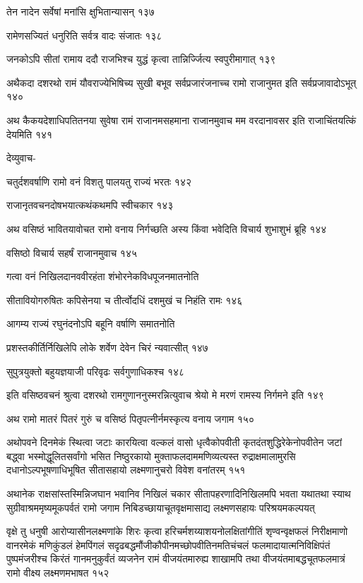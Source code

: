 तेन नादेन सर्वेषां मनांसि क्षुभितान्यासन् १३७

रामेणसज्यितं धनुरिति सर्वत्र वादः संजातः १३८

जनकोऽपि सीतां रामाय ददौ राजभिश्च युद्धं कृत्वा तान्निर्ज्जित्य स्वपुरीमागात् १३९

अथैकदा दशरथो रामं यौवराज्येभिषिच्य सुखी बभूव सर्वप्रजारंजनाच्च रामो राजानुमत इति
सर्वप्रजावादोऽभूत् १४०

अथ कैकयदेशाधिपतितनया सुवेषा रामं राजानमसहमाना राजानमुवाच मम वरदानावसर इति
राजाचिंतयत्किं देयमिति १४१

देव्युवाच-

चतुर्दशवर्षाणि रामो वनं विशतु पालयतु राज्यं भरतः १४२

राजानृतवचनदोषभयात्कथंकथमपि स्वीचकार १४३

अथ वसिष्ठं भावितयावोचत रामो वनाय निर्गच्छति अस्य किंवा भवेदिति विचार्य शुभाशुभं
ब्रूहि १४४

वसिष्ठो विचार्य सहर्षं राजानमुवाच १४५

गत्वा वनं निखिलदानववीरहंता शंभोरनेकविधपूजनमातनोति

सीतावियोगरुषितः कपिसेनया च तीर्त्वोदधिं दशमुखं च निहंति रामः १४६

आगम्य राज्यं रघुनंदनोऽपि बहूनि वर्षाणि समातनोति

प्रशस्तकीर्तिर्निखिलेपि लोके शर्वेण देवेन चिरं न्यवात्सीत् १४७

सुपुत्रयुक्तो बहुयज्ञयाजी परिवृढः सर्वगुणाधिकश्च १४८

इति वसिष्ठवचनं श्रुत्वा दशरथो रामगुणाननुस्मरन्नित्युवाच श्रेयो मे मरणं रामस्य निर्गमने इति
१४९

अथ रामो मातरं पितरं गुरुं च वसिष्ठं पितृपत्नीर्नमस्कृत्य वनाय जगाम १५०

अथोपवने दिनमेकं स्थित्वा जटाः कारयित्वा वल्कलं वासो धृत्वैकोपवीती कृतदंतशुद्धिरेकेनोपवीतेन
जटां बद्ध्वा भस्मोद्धूलितसर्वांगो भसित निष्ठुरकायो मुक्ताफलदाममणिव्यत्यस्त
रुद्राक्षमालामुरसि दधानोऽल्पभूषणाधिभूषित सीतासहायो लक्ष्मणानुचरो विवेश वनांतरम् १५१

अथानेक राक्षसांस्तस्मिन्निजघान भवानिव निखिलं चकार सीतापहरणादिनिखिलमपि भवता
यथातथा स्याथ सुग्रीवाश्रममृष्यमूकपर्वतं रामो जगाम निबिडच्छायाचूतवृक्षमासाद्य
लक्ष्मणसहायः परिश्रयमकल्पयत्

वृक्षे तु धनुषी आरोप्यासीनलक्ष्मणांके शिरः कृत्वा हरिचर्मशय्याशयनोलक्षितांगीतिं शृण्वन्वृक्षफलं
निरीक्षमाणो वानरमेकं मणिकुंडलं हेमपिंगलं सदृढबद्धमौंजीकौपीनमच्छोपवीतिनमतिचंचलं
फलमादायात्मनिविक्षिपंतं पुष्पमंजरीश्च किरंतं गानमनुकुर्वंतं व्यजनेन रामं वीजयंतमारुह्य
शाखामपि तथा वीजयंतमाबद्धचूतफलमात्रं रामो वीक्ष्य लक्ष्मणमभाषत १५२

